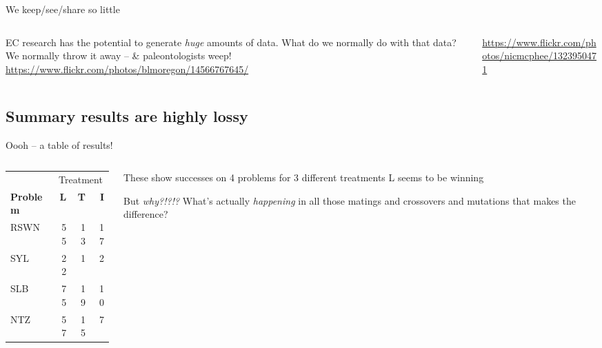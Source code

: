 \documentclass{beamer}
\newcommand{\linespace}{\vskip 0.25cm}
\begin{document}
\begin{frame}{We keep/see/share so little}
	
	\begin{columns}
		\begin{column}{0.6 \linewidth}
			EC research has the potential to generate \emph{huge} amounts of data.
			\linespace
			What do we normally do with that data?
			\linespace
			We normally throw it away -- \& paleontologists weep!
			\linespace
			\tiny{\url{https://www.flickr.com/photos/blmoregon/14566767645/}}
		\end{column}
		\begin{column}{0.4 \linewidth}
			\tiny{\url{https://www.flickr.com/photos/nicmcphee/1323950471}}
		\end{column}
	\end{columns}
\end{frame}

\subsection{Summary results are highly lossy}

\begin{frame}{Oooh -- a table of results!}

\begin{columns}
	\begin{column}{0.4 \linewidth}
		\centering
\begin{tabular}{lrrr}
	& \multicolumn{3}{c}{Treatment} \\ \cline{2-4}
	\textbf{Problem} & \textbf{L} & \textbf{T} & \textbf{I} \\
	\hline
	RSWN & 55 & 13 & 17 \\
	SYL & 22 & 1 & 2 \\
	SLB & 75 & 19 & 10 \\
	NTZ & 57 & 15 & 7
\end{tabular}
\end{column}

\begin{column}{0.55 \linewidth}
	\begin{overprint}
		\onslide<1>
		These show successes on 4 problems for 3 different treatments
		\linespace
		L seems to be winning

		\onslide<2>
		But \emph{why?!?!?}		
		\linespace
		What's actually \emph{happening} in all those matings and crossovers and mutations that makes the difference?
	\end{overprint}
\end{column}
\end{columns}
\end{frame}
\end{document}
